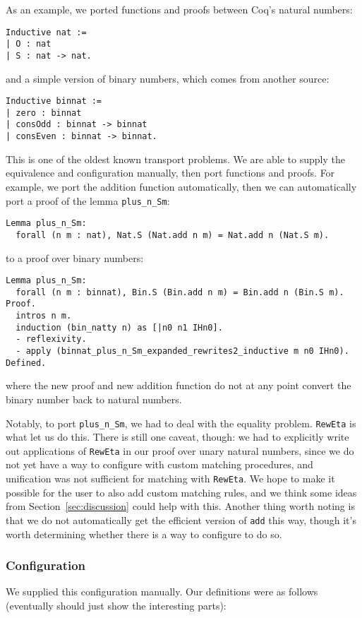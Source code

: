 As an example, we ported functions and proofs between Coq's natural numbers:

\begin{lstlisting}
Inductive nat :=
| O : nat
| S : nat -> nat.
\end{lstlisting}
and a simple version of binary numbers, which comes from another source:

\begin{lstlisting}
Inductive binnat :=
| zero : binnat
| consOdd : binnat -> binnat
| consEven : binnat -> binnat.
\end{lstlisting}
This is one of the oldest known transport problems.
We are able to supply the equivalence and configuration manually,
then port functions and proofs.
For example, we port the addition function automatically,
then we can automatically port a proof of the lemma \lstinline{plus_n_Sm}:

\begin{lstlisting}
Lemma plus_n_Sm:
  forall (n m : nat), Nat.S (Nat.add n m) = Nat.add n (Nat.S m).
\end{lstlisting}
to a proof over binary numbers:

\begin{lstlisting}
Lemma plus_n_Sm:
  forall (n m : binnat), Bin.S (Bin.add n m) = Bin.add n (Bin.S m).
Proof.
  intros n m.
  induction (bin_natty n) as [|n0 n1 IHn0].
  - reflexivity.
  - apply (binnat_plus_n_Sm_expanded_rewrites2_inductive m n0 IHn0).
Defined.
\end{lstlisting}
where the new proof and new addition function do not at any point convert
the binary number back to natural numbers.

Notably, to port \lstinline{plus_n_Sm}, we had to deal with the equality problem.
\lstinline{RewEta} is what let us do this.
There is still one caveat, though: we had to explicitly write out applications of \lstinline{RewEta}
in our proof over unary natural numbers, since we do not yet have a way to configure \toolname with custom
matching procedures, and unification was not sufficient for matching with \lstinline{RewEta}.
We hope to make it possible for the user to also add custom matching rules,
and we think some ideas from Section~\ref{sec:discussion} could help with this.
Another thing worth noting is that we do not automatically get the efficient version of \lstinline{add} this way,
though it's worth determining whether there is a way to configure \toolname to do so.

\subsubsection{Configuration}
We supplied this configuration manually.
Our definitions were as follows (eventually should just show the interesting parts):

